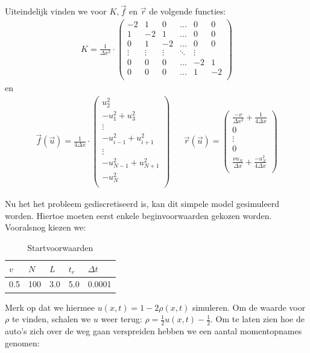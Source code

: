 \documentclass{article}
\newcommand{\Dt}{\Delta t}
\begin{document}
Uiteindelijk vinden we voor \(K,\vec{f}\) en \(\vec{r}\) de volgende functies:
\begin{align*}
K = \frac{1}{\Delta x^2}\cdot\begin{pmatrix}
-2 & 1 & 0 & \hdots & 0 & 0\\
1 & -2 & 1 & \hdots & 0 & 0\\
0 & 1 & -2 & \hdots & 0 & 0\\
\vdots & \vdots & \vdots & \ddots & \vdots\\
0 & 0 & 0 & \hdots & -2 & 1\\
0 & 0 & 0 & \hdots & 1 & -2\\
\end{pmatrix}
\end{align*}
en
\begin{align*}
\vec{f}(\vec{u}) = \frac{1}{4\Delta x}\cdot
\begin{pmatrix}
u_2^2\\
-u_1^2 + u_3^2\\
\vdots\\
-u_{i-1}^2+u_{i+1}^2\\
\vdots\\
-u_{N-1}^2+u_{N+1}^2\\
-u_N^2\\
\end{pmatrix}
&&
\vec{r}(\vec{u}) = 
\begin{pmatrix}
\frac{-\nu}{\Delta x^2} + \frac{1}{4\Delta x}\\
0\\
\vdots\\
0\\
\frac{\nu u_N}{\Delta x} + \frac{-u_N^2}{4\Delta x}\\
\end{pmatrix}
\end{align*}

Nu het het probleem gediscretiseerd is, kan dit simpele model gesimuleerd worden. Hiertoe moeten eerst enkele beginvoorwaarden gekozen worden. Vooralsnog kiezen we:
\begin{table}[H]
\centering
\label{tab:specs}
\begin{tabular}{|l|l|l|l|l|}
\hline
\(v\) & \(N\) & \(L\) & \(t_e\) & \(\Dt\) \\ \hline
 0.5 & 100 & 3.0 & 5.0 & 0.0001 \\ \hline
\end{tabular}
\caption{Startvoorwaarden}
\end{table}
Merk op dat we hiermee \(u(x,t)=1-2\rho(x,t)\) simuleren. Om de waarde voor \(\rho\)  te vinden, schalen we \(u\) weer terug: \(\rho =\frac{1}{2}u(x,t)-\frac{1}{2}\).
\newpage
Om te laten zien hoe de auto's zich over de weg gaan verspreiden hebben we een aantal momentopnames genomen:
\end{document}
